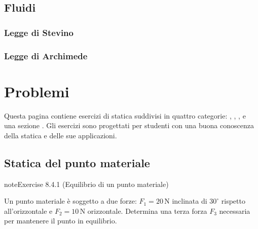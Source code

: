 \documentclass[letterpaper,10pt,italian]{jupyterBook}
\begin{document}
\subsection{Fluidi}
\label{\detokenize{ch/mechanics/statics-fluid:fluidi}}\label{\detokenize{ch/mechanics/statics-fluid:physics-hs-mechanics-statics-fluid-fluid}}

\subsubsection{Legge di Stevino}
\label{\detokenize{ch/mechanics/statics-fluid:legge-di-stevino}}\label{\detokenize{ch/mechanics/statics-fluid:physics-hs-mechanics-statics-fluid-stevino}}

\subsubsection{Legge di Archimede}
\label{\detokenize{ch/mechanics/statics-fluid:legge-di-archimede}}\label{\detokenize{ch/mechanics/statics-fluid:physics-hs-mechanics-statics-fluid-archimede}}
\sphinxstepscope


\section{Problemi}
\label{\detokenize{ch/mechanics/statics-problems:problemi}}\label{\detokenize{ch/mechanics/statics-problems:physics-hs-mechanics-statics-problems}}\label{\detokenize{ch/mechanics/statics-problems::doc}}
\sphinxAtStartPar
Questa pagina contiene esercizi di statica suddivisi in quattro categorie: , , , e una sezione . Gli esercizi sono progettati per studenti con una buona conoscenza della statica e delle sue applicazioni.


\subsection{Statica del punto materiale}
\label{\detokenize{ch/mechanics/statics-problems:statica-del-punto-materiale}} \label{exercise:ch/mechanics/statics-problems-exercise-0}

\begin{sphinxadmonition}{note}{Exercise 8.4.1 (Equilibrio di un punto materiale)}



\sphinxAtStartPar
Un punto materiale è soggetto a due forze: \(F_1 = 20 \, \text{N}\) inclinata di \(30^\circ\) rispetto all’orizzontale e \(F_2 = 10 \, \text{N}\) orizzontale. Determina una terza forza \(F_3\) necessaria per mantenere il punto in equilibrio.
\end{sphinxadmonition}
 \label{exercise:ch/mechanics/statics-problems-exercise-1}
\end{document}
